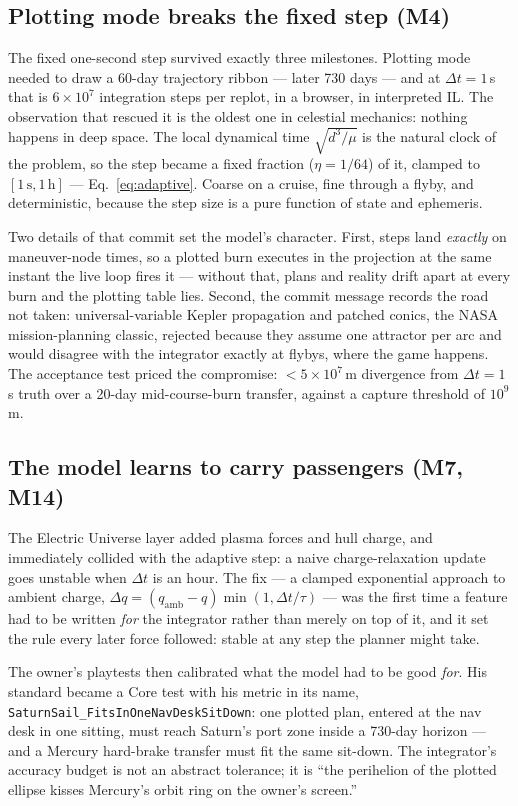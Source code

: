 \documentclass[10pt,twocolumn]{article}
\newcommand{\dt}{\Delta t}
\begin{document}
\subsection{Plotting mode breaks the fixed step (M4)}

The fixed one-second step survived exactly three milestones. Plotting mode needed to draw
a 60-day trajectory ribbon --- later 730 days --- and at $\dt = 1$\,s that is $6 \times
10^{7}$ integration steps per replot, in a browser, in interpreted IL. The observation
that rescued it is the oldest one in celestial mechanics: nothing happens in deep space.
The local dynamical time $\sqrt{d^{3}/\mu}$ is the natural clock of the problem, so the
step became a fixed fraction ($\eta = 1/64$) of it, clamped to $[1\,\text{s}, 1\,\text{h}]$
--- Eq.~\eqref{eq:adaptive}. Coarse on a cruise, fine through a flyby, and deterministic,
because the step size is a pure function of state and ephemeris.

Two details of that commit set the model's character. First, steps land \emph{exactly} on
maneuver-node times, so a plotted burn executes in the projection at the same instant the
live loop fires it --- without that, plans and reality drift apart at every burn and the
plotting table lies. Second, the commit message records the road not taken:
universal-variable Kepler propagation and patched conics, the NASA mission-planning
classic, rejected because they assume one attractor per arc and would disagree with the
integrator exactly at flybys, where the game happens. The acceptance test priced the
compromise: $<5\times10^{7}$\,m divergence from $\dt=1$\,s truth over a 20-day
mid-course-burn transfer, against a capture threshold of $10^{9}$\,m.

\subsection{The model learns to carry passengers (M7, M14)}

The Electric Universe layer added plasma forces and hull charge, and immediately
collided with the adaptive step: a naive charge-relaxation update goes unstable when
$\dt$ is an hour. The fix --- a clamped exponential approach to ambient charge,
$\Delta q = (q_{\text{amb}} - q)\min(1, \dt/\tau)$ --- was the first time a feature had
to be written \emph{for} the integrator rather than merely on top of it, and it set the
rule every later force followed: stable at any step the planner might take.

The owner's playtests then calibrated what the model had to be good \emph{for}. His
standard became a Core test with his metric in its name,
\texttt{SaturnSail\_FitsInOneNavDeskSitDown}: one plotted plan, entered at the nav desk
in one sitting, must reach Saturn's port zone inside a 730-day horizon --- and a Mercury
hard-brake transfer must fit the same sit-down. The integrator's accuracy budget is not
an abstract tolerance; it is ``the perihelion of the plotted ellipse kisses Mercury's
orbit ring on the owner's screen.''
\end{document}
